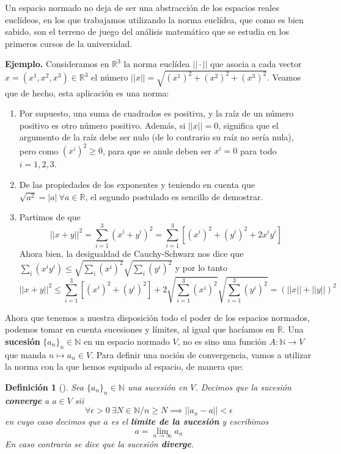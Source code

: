\documentclass[12pt]{report}
\newtheorem{definition}{Definición}
\newenvironment{dft}[1][]
    {\begin{leftbar}\begin{definition}[#1]}
    {\end{definition}\end{leftbar}}
\begin{document}
Un espacio normado no deja de ser una abstracción de los espacios reales euclídeos, en los que trabajamos utilizando la norma euclídea, que como es bien sabido, son el terreno de juego del análisis matemático que se estudia en los primeros cursos de la universidad.

\textbf{Ejemplo.} Consideramos en $\mathbb{R}^3$ la norma euclídea $||\cdot ||$ que asocia a cada vector $x=(x^1,x^2,x^3)\in\mathbb{R}^3$ el número $||x||=\sqrt{(x^1)^2+(x^2)^2+(x^3)^2}$. Veamos que de hecho, esta aplicación es una norma:
\begin{enumerate}
    \item Por supuesto, una suma de cuadrados es positiva, y la raíz de un número positivo es otro número positivo. Además, si $||x||=0$, significa que el argumento de la raíz debe ser nulo (de lo contrario su raíz no sería nula), pero como $(x^i)^2\geq 0$, para que se anule deben ser $x^i=0$ para todo $i=1,2,3$.
    \item De las propiedades de los exponentes y teniendo en cuenta que $\sqrt{a^2}=|a|\ \forall a\in\mathbb{R}$, el segundo postulado es sencillo de demostrar.
    \item Partimos de que $$||x+y||^2=\sum_{i=1}^3 (x^i+y^i)^2=\sum_{i=1}^3\left[ (x^i)^2+(y^i)^2+2x^iy^i\right]$$
    Ahora bien, la desigualdad de Cauchy-Schwarz nos dice que $\sum_i(x^iy^i)\leq\sqrt{\sum_i (x^i)^2}\sqrt{\sum_i (y^i)^2}$ y por lo tanto 
    $$||x+y||^2\leq\sum_{i=1}^3\left[ (x^i)^2+(y^i)^2\right] +2\sqrt{\sum_{i=1}^3 (x^i)^2}\sqrt{\sum_{i=1}^3(y^i)^2}=\left( ||x||+||y||\right)^2
    $$
\end{enumerate}

Ahora que tenemos a nuestra disposición todo el poder de los espacios normados, podemos tomar en cuenta sucesiones y límites, al igual que hacíamos en $\mathbb{R}$. Una \textbf{sucesión} $\{ a_n\}_n\in\mathbb{N}$ en un espacio normado $V$, no es sino una función $A:\mathbb{N}\to V$ que manda $n\mapsto a_n\in V$. Para definir una noción de convergencia, vamos a utilizar la norma con la que hemos equipado al espacio, de manera que:
\begin{dft}
Sea $\{ a_n\}_n\in\mathbb{N}$ una sucesión en $V$. Decimos que la sucesión \textbf{converge} a $a\in V$ sii $$\forall \epsilon >0\ \exists N\in\mathbb{N}/n\geq N\implies ||a_n-a||<\epsilon$$
en cuyo caso decimos que $a$ es el \textbf{límite de la sucesión} y escribimos
$$a=\lim_{n\to \infty}a_n$$
En caso contrario se dice que la sucesión \textbf{diverge}.
\end{dft}
\end{document}
